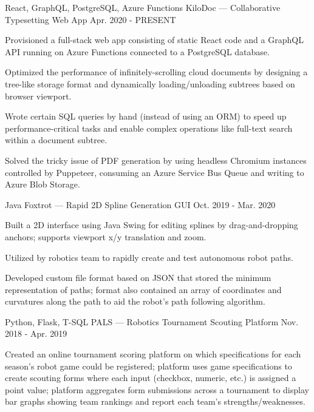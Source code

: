
\begin{cventries}
  \cventry
  {React, GraphQL, PostgreSQL, Azure Functions} %
  {KiloDoc --- Collaborative Typesetting Web App} %
  {} %
  {Apr. 2020 - PRESENT} %
  {
    \begin{cvitems} %
      \item {Provisioned a full-stack web app consisting of static React code and a GraphQL API running on Azure Functions connected to a PostgreSQL database.}
      \item {Optimized the performance of infinitely-scrolling cloud documents by designing a tree-like storage format and dynamically loading/unloading subtrees based on browser viewport.}
      \item {Wrote certain SQL queries by hand (instead of using an ORM) to speed up performance-critical tasks and enable complex operations like full-text search within a document subtree.}
      \item {Solved the tricky issue of PDF generation by using headless Chromium instances controlled by Puppeteer, consuming an Azure Service Bus Queue and writing to Azure Blob Storage.}
    \end{cvitems}
  }

  \cventry
  {Java} %
  {Foxtrot --- Rapid 2D Spline Generation GUI} %
  {} %
  {Oct. 2019 - Mar. 2020} %
  {
    \begin{cvitems} %
      \item {Built a 2D interface using Java Swing for editing splines by drag-and-dropping anchors; supports viewport x/y translation and zoom.}
      \item {Utilized by robotics team to rapidly create and test autonomous robot paths.}
      \item {Developed custom file format based on JSON that stored the minimum representation of paths; format also contained an array of coordinates and curvatures along the path to aid the robot's path following algorithm.}
    \end{cvitems}
  }

  \cventry
  {Python, Flask, T-SQL} %
  {PALS --- Robotics Tournament Scouting Platform} %
  {} %
  {Nov. 2018 - Apr. 2019} %
  {
    \begin{cvitems} %
      \item {Created an online tournament scoring platform on which specifications for each season's robot game could be registered; platform uses game specifications to create scouting forms where each input (checkbox, numeric, etc.) is assigned a point value; platform aggregates form submissions across a tournament to display bar graphs showing team rankings and report each team's strengths/weaknesses.}
    \end{cvitems}
  }
\end{cventries}
